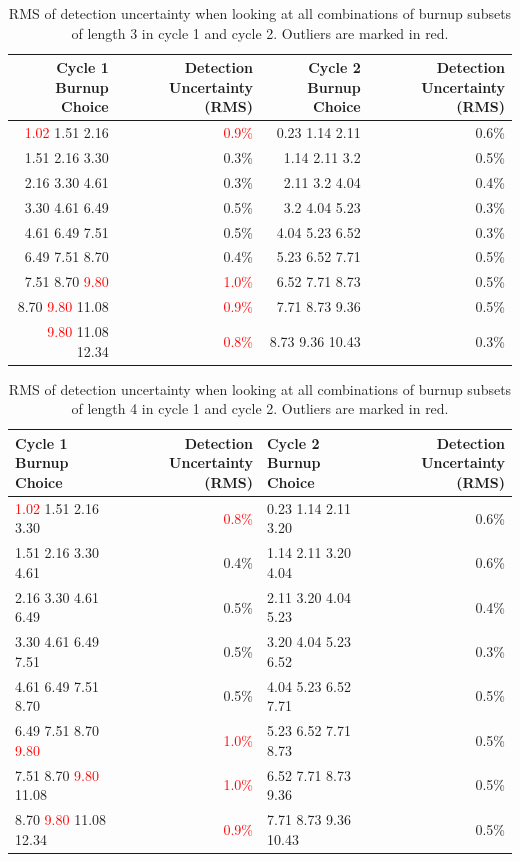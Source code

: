 \documentclass{article}
\begin{document}
\begin{table}[!htb]
  \centering
  \begin{tabular}{DDDD}\toprule
     Cycle 1 Burnup Choice & Detection Uncertainty (RMS) & Cycle 2 Burnup Choice & Detection Uncertainty (RMS) \\ \midrule
     \textcolor{red}{1.02} 1.51 2.16 & \textcolor{red}{0.9\%} & 0.23 1.14 2.11 & 0.6\% \\
     1.51 2.16 3.30 & 0.3\% & 1.14 2.11 3.2 & 0.5\% \\
     2.16 3.30 4.61 & 0.3\% & 2.11 3.2 4.04 & 0.4\% \\
     3.30 4.61 6.49 & 0.5\% & 3.2 4.04 5.23 & 0.3\% \\
     4.61 6.49 7.51 & 0.5\% & 4.04 5.23 6.52 & 0.3\% \\
     6.49 7.51 8.70 & 0.4\% & 5.23 6.52 7.71 & 0.5\% \\
     7.51 8.70 \textcolor{red}{9.80} & \textcolor{red}{1.0\%} & 6.52 7.71 8.73 & 0.5\% \\
     8.70 \textcolor{red}{9.80} 11.08 & \textcolor{red}{0.9\%} & 7.71 8.73 9.36 & 0.5\% \\
     \textcolor{red}{9.80} 11.08 12.34 & \textcolor{red}{0.8\%} & 8.73 9.36 10.43 & 0.3\% \\ \bottomrule
  \end{tabular}
  \caption{RMS of detection uncertainty when looking at all combinations of burnup subsets of length 3 in cycle 1 and cycle 2. Outliers are marked in red.}
  \label{table:bu_index_len3}
\end{table}


\begin{table}[!htb]
  \centering
  \begin{tabular}{FDED}\toprule
     Cycle 1 Burnup Choice & Detection Uncertainty (RMS) & Cycle 2 Burnup Choice & Detection Uncertainty (RMS) \\ \midrule
     \textcolor{red}{1.02} 1.51 2.16 3.30 & \textcolor{red}{0.8\%} & 0.23 1.14 2.11 3.20 & 0.6\% \\
     1.51 2.16 3.30 4.61 & 0.4\% & 1.14 2.11 3.20 4.04 & 0.6\% \\
     2.16 3.30 4.61 6.49 & 0.5\% & 2.11 3.20 4.04 5.23 & 0.4\% \\
     3.30 4.61 6.49 7.51 & 0.5\% & 3.20 4.04 5.23 6.52 & 0.3\% \\
     4.61 6.49 7.51 8.70 & 0.5\% & 4.04 5.23 6.52 7.71 & 0.5\% \\
     6.49 7.51 8.70 \textcolor{red}{9.80} & \textcolor{red}{1.0\%} & 5.23 6.52 7.71 8.73 & 0.5\% \\
     7.51 8.70 \textcolor{red}{9.80} 11.08 & \textcolor{red}{1.0\%} & 6.52 7.71 8.73 9.36 & 0.5\% \\
     8.70 \textcolor{red}{9.80} 11.08 12.34 & \textcolor{red}{0.9\%} & 7.71 8.73 9.36 10.43 & 0.5\% \\ \bottomrule
  \end{tabular}
  \caption{RMS of detection uncertainty when looking at all combinations of burnup subsets of length 4 in cycle 1 and cycle 2. Outliers are marked in red.}
  \label{table:bu_index_len4}
\end{table}
\end{document}
